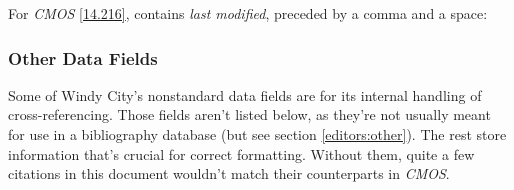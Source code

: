 \documentclass[11pt,letterpaper,oneside]{article}
\begin{document}
\begin{marglist}
\begin{bibonly}
\nocite{hong2015}
\nocite{teplin2005}
\end{bibonly}

\noindent For \textit{CMOS} \ref{14.216}, 
contains \textit{last modified}, preceded by a comma and a space:

\begin{citebib}
\item \cite{balderdash2017}
\end{citebib}

\end{marglist}

\subsubsection{Other Data Fields}
\label{otherfields}

Some of Windy City's nonstandard data fields are for its internal
handling of cross-referencing. Those fields aren't listed below, as
they're not usually meant for use in a bibliography database (but see
section \ref{editors:other}). The rest store information that's
crucial for correct formatting. Without them, quite a few citations in
this document wouldn't match their counterparts in \textit{CMOS}.
\end{document}
